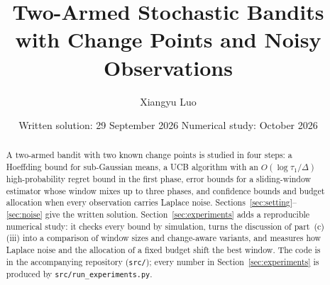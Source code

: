 \documentclass[11pt,a4paper]{article}
\title{Two-Armed Stochastic Bandits\\with Change Points and Noisy Observations}
\author{Xiangyu Luo}
\date{Written solution: 29 September 2026 \quad Numerical study: October 2026}
\numberwithin{equation}{section}
\begin{document}
\maketitle

\begin{abstract}
A two-armed bandit with two known change points is studied in four steps: a Hoeffding bound for sub-Gaussian means, a UCB algorithm with an $O(\log\tau_1/\Delta)$ high-probability regret bound in the first phase, error bounds for a sliding-window estimator whose window mixes up to three phases, and confidence bounds and budget allocation when every observation carries Laplace noise. Sections~\ref{sec:setting}--\ref{sec:noise} give the written solution. Section~\ref{sec:experiments} adds a reproducible numerical study: it checks every bound by simulation, turns the discussion of part~(c)(iii) into a comparison of window sizes and change-aware variants, and measures how Laplace noise and the allocation of a fixed budget shift the best window. The code is in the accompanying repository (\texttt{src/}); every number in Section~\ref{sec:experiments} is produced by \texttt{src/run\_experiments.py}.
\end{abstract}

\tableofcontents



\end{document}
